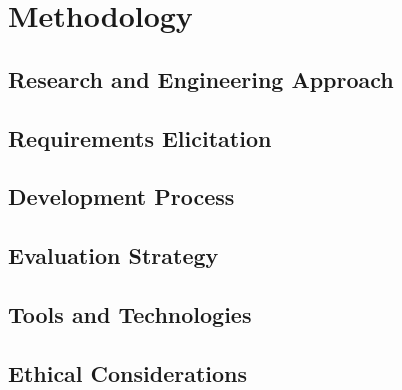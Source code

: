 \chapter{Methodology}
\label{ch:methodology}

\section{Research and Engineering Approach}

\section{Requirements Elicitation}

\section{Development Process}

\section{Evaluation Strategy}

\section{Tools and Technologies}

\section{Ethical Considerations}

